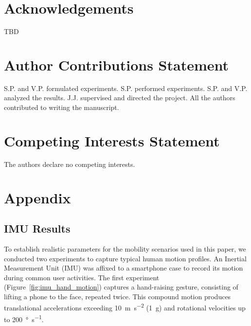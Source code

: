 \documentclass[fleqn,10pt]{wlscirep}
\begin{document}
\section*{Acknowledgements}
{\color{red}TBD}

\section*{Author Contributions Statement}
S.P. and V.P. formulated experiments. S.P. performed experiments. S.P. and V.P. analyzed the results. J.J. supervised and directed the project. All the authors contributed to writing the manuscript.

\section*{Competing Interests Statement}
The authors declare no competing interests.

\newpage
\section*{Appendix}
\subsection*{IMU Results}
To establish realistic parameters for the mobility scenarios used in this paper, we conducted two experiments to capture typical human motion profiles. An Inertial Measurement Unit (IMU) was affixed to a smartphone case to record its motion during common user activities. The first experiment (Figure~\ref{fig:imu_hand_motion}) captures a hand-raising gesture, consisting of lifting a phone to the face, repeated twice. This compound motion produces translational accelerations exceeding \SI{10}{\meter\per\second\squared} (\SI{1}{g}) and rotational velocities up to \SI{200}{\degree\per\second}. 
\end{document}
